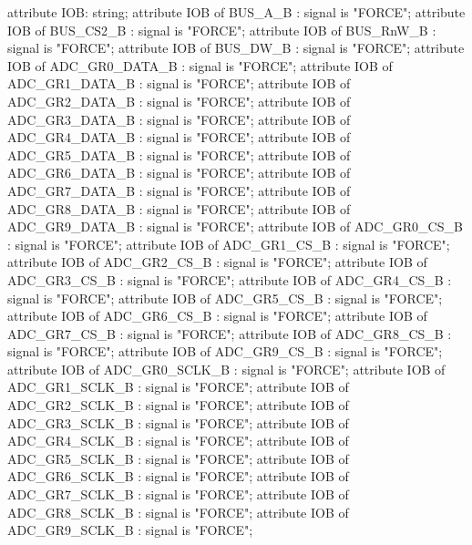 \begin{mylisting}[language=VHDL,caption=トップモジュール,label=appF_Top_module_VHDL]
	attribute IOB: string;
	attribute IOB of BUS_A_B : signal is "FORCE";
	attribute IOB of BUS_CS2_B : signal is "FORCE";
	attribute IOB of BUS_RnW_B : signal is "FORCE";
	attribute IOB of BUS_DW_B : signal is "FORCE";
	attribute IOB of ADC_GR0_DATA_B : signal is "FORCE";
	attribute IOB of ADC_GR1_DATA_B : signal is "FORCE";
	attribute IOB of ADC_GR2_DATA_B : signal is "FORCE";
	attribute IOB of ADC_GR3_DATA_B : signal is "FORCE";
	attribute IOB of ADC_GR4_DATA_B : signal is "FORCE";
	attribute IOB of ADC_GR5_DATA_B : signal is "FORCE";
	attribute IOB of ADC_GR6_DATA_B : signal is "FORCE";
	attribute IOB of ADC_GR7_DATA_B : signal is "FORCE";
	attribute IOB of ADC_GR8_DATA_B : signal is "FORCE";
	attribute IOB of ADC_GR9_DATA_B : signal is "FORCE";
	attribute IOB of ADC_GR0_CS_B : signal is "FORCE";
	attribute IOB of ADC_GR1_CS_B : signal is "FORCE";
	attribute IOB of ADC_GR2_CS_B : signal is "FORCE";
	attribute IOB of ADC_GR3_CS_B : signal is "FORCE";
	attribute IOB of ADC_GR4_CS_B : signal is "FORCE";
	attribute IOB of ADC_GR5_CS_B : signal is "FORCE";
	attribute IOB of ADC_GR6_CS_B : signal is "FORCE";
	attribute IOB of ADC_GR7_CS_B : signal is "FORCE";
	attribute IOB of ADC_GR8_CS_B : signal is "FORCE";
	attribute IOB of ADC_GR9_CS_B : signal is "FORCE";
	attribute IOB of ADC_GR0_SCLK_B : signal is "FORCE";
	attribute IOB of ADC_GR1_SCLK_B : signal is "FORCE";
	attribute IOB of ADC_GR2_SCLK_B : signal is "FORCE";
	attribute IOB of ADC_GR3_SCLK_B : signal is "FORCE";
	attribute IOB of ADC_GR4_SCLK_B : signal is "FORCE";
	attribute IOB of ADC_GR5_SCLK_B : signal is "FORCE";
	attribute IOB of ADC_GR6_SCLK_B : signal is "FORCE";
	attribute IOB of ADC_GR7_SCLK_B : signal is "FORCE";
	attribute IOB of ADC_GR8_SCLK_B : signal is "FORCE";
	attribute IOB of ADC_GR9_SCLK_B : signal is "FORCE";


\end{mylisting}
